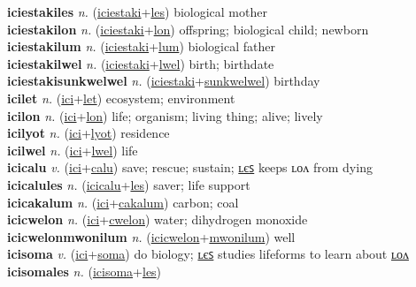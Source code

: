 \textbf{iciestakiles} \textit{n.} (\hyperref[iciestaki]{iciestaki}+\hyperref[les]{les})
biological mother \label{iciestakiles} \\
\textbf{iciestakilon} \textit{n.} (\hyperref[iciestaki]{iciestaki}+\hyperref[lon]{lon})
offspring; biological child; newborn \label{iciestakilon} \\
\textbf{iciestakilum} \textit{n.} (\hyperref[iciestaki]{iciestaki}+\hyperref[lum]{lum})
biological father \label{iciestakilum} \\
\textbf{iciestakilwel} \textit{n.} (\hyperref[iciestaki]{iciestaki}+\hyperref[lwel]{lwel})
birth; birthdate \label{iciestakilwel} \\
\textbf{iciestakisunkwelwel} \textit{n.} (\hyperref[iciestaki]{iciestaki}+\hyperref[sunkwelwel]{sunkwelwel})
birthday \label{iciestakisunkwelwel} \\
\textbf{icilet} \textit{n.} (\hyperref[ici]{ici}+\hyperref[let]{let})
ecosystem; environment \label{icilet} \\
\textbf{icilon} \textit{n.} (\hyperref[ici]{ici}+\hyperref[lon]{lon})
life; organism; living thing; alive; lively \label{icilon} \\
\textbf{icilyot} \textit{n.} (\hyperref[ici]{ici}+\hyperref[lyot]{lyot})
residence \label{icilyot} \\
\textbf{icilwel} \textit{n.} (\hyperref[ici]{ici}+\hyperref[lwel]{lwel})
life \label{icilwel} \\
\textbf{icicalu} \textit{v.} (\hyperref[ici]{ici}+\hyperref[calu]{calu})
save; rescue; sustain; \hyperref[icicalules]{ʟєꜱ} keeps ʟᴏᴧ from dying \label{icicalu} \\
\textbf{icicalules} \textit{n.} (\hyperref[icicalu]{icicalu}+\hyperref[les]{les})
saver; life support \label{icicalules} \\
\textbf{icicakalum} \textit{n.} (\hyperref[ici]{ici}+\hyperref[cakalum]{cakalum})
carbon; coal \label{icicakalum} \\
\textbf{icicwelon} \textit{n.} (\hyperref[ici]{ici}+\hyperref[cwelon]{cwelon})
water; dihydrogen monoxide \label{icicwelon} \\
\textbf{icicwelonmwonilum} \textit{n.} (\hyperref[icicwelon]{icicwelon}+\hyperref[mwonilum]{mwonilum})
well \label{icicwelonmwonilum} \\
\textbf{icisoma} \textit{v.} (\hyperref[ici]{ici}+\hyperref[soma]{soma})
do biology; \hyperref[icisomales]{ʟєꜱ} studies lifeforms to learn about \hyperref[icisomalon]{ʟᴏᴧ} \label{icisoma} \\
\textbf{icisomales} \textit{n.} (\hyperref[icisoma]{icisoma}+\hyperref[les]{les})
